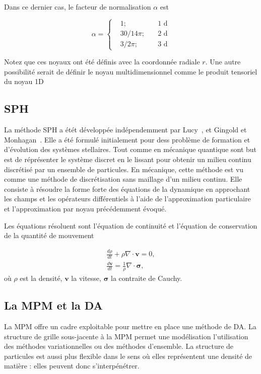 Dans ce dernier cas, le facteur de normalisation $\alpha$ est

\begin{equation*}
    \alpha = \left\{ \begin{aligned}
         & 1;    \quad      & 1\text{ d} \\
         & 30/14 \pi; \quad & 2\text{ d} \\
         & 3/ 2\pi; \quad   & 3\text{ d}
    \end{aligned}
    \right.
\end{equation*}

Notez que ces noyaux ont été définis avec la coordonnée radiale $r$. Une autre possibilité serait de définir le noyau multidimensionnel comme le produit tensoriel du noyau 1D

\subsection{SPH}

La méthode SPH a étét développée indépendemment par Lucy~\cite{lucy_1977}, et Gingold et Monhagan~\cite{gingold_monaghan_sph_1977}. Elle a été formulé initialement pour dess problème de formation et d'évolution des systèmes stellaires. Tout comme en mécanique quantique sont but est de réprésenter le système discret en le lissant pour obtenir un milieu continu discrétisé par un ensemble de particules. En mécanique, cette méthode est vu comme une méthode de discrétisation sans maillage d'un milieu continu.
Elle consiste à résoudre la forme forte des équations de la dynamique en approchant les champs et les opérateurs différentiels à l'aide de l'approximation particulaire et l'approximation par noyau précédemment évoqué.

Les équations résoluent sont l'équation de continuité et l'équation de conservation de la quantité de mouvement

\begin{eqnarray*}
    \frac{d\rho}{dt} + \rho \nabla \cdot \bm{v} = 0, \\
    \frac{d\bm v}{dt} = \frac1\rho \nabla \cdot \bm \sigma,
\end{eqnarray*}où $\rho$ est la densité, $\bm v$ la vitesse, $\bm \sigma$ la contraite de Cauchy.




\subsection{La MPM et la DA}
La MPM offre un cadre exploitable pour mettre en place une méthode de DA.
La structure de grille sous-jacente à la MPM permet une modélisation l'utilisation des méthodes variationnelles ou des méthodes d'ensemble. La structure de particules est aussi plus flexible dans le sens où elles représentent une densité de matière : elles peuvent donc s'interpénétrer.


